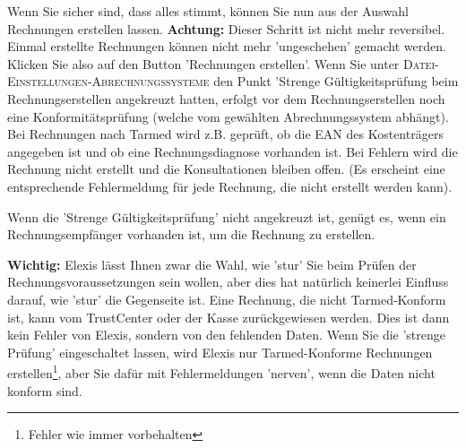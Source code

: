 \documentclass[a4paper]{scrartcl}
\begin{document}
Wenn Sie sicher sind, dass alles stimmt, können Sie nun aus der Auswahl Rechnungen erstellen lassen. \textbf{Achtung:} Dieser Schritt ist nicht mehr reversibel. Einmal erstellte Rechnungen können nicht mehr 'ungeschehen' gemacht werden. Klicken Sie also auf den Button 'Rechnungen erstellen'.
Wenn Sie unter \textsc{Datei-Einstellungen-Abrechnungssysteme} den Punkt 'Strenge Gültigkeitsprüfung beim Rechnungserstellen  angekreuzt hatten, erfolgt vor dem Rechnungserstellen noch eine Konformitätsprüfung (welche  vom gewählten Abrechnungssystem abhängt). Bei Rechnungen nach Tarmed wird z.B. geprüft, ob die EAN des Kostenträgers angegeben ist und ob eine Rechnungsdiagnose vorhanden ist. Bei Fehlern wird die Rechnung nicht erstellt und die Konsultationen bleiben offen. (Es erscheint eine entsprechende Fehlermeldung für jede Rechnung, die nicht erstellt werden kann).

Wenn die 'Strenge Gültigkeitsprüfung' nicht angekreuzt ist, genügt es, wenn ein Rechnungsempfänger vorhanden ist, um die Rechnung zu erstellen.

\medskip

\textbf{Wichtig:} Elexis lässt Ihnen zwar die Wahl, wie 'stur' Sie beim Prüfen der Rechnungsvoraussetzungen sein wollen, aber dies hat natürlich keinerlei Einfluss darauf, wie 'stur' die Gegenseite ist. Eine Rechnung, die nicht Tarmed-Konform ist, kann vom TrustCenter oder der Kasse zurückgewiesen werden. Dies ist dann kein Fehler von Elexis, sondern von den fehlenden Daten. Wenn Sie die 'strenge Prüfung' eingeschaltet lassen, wird Elexis nur Tarmed-Konforme Rechnungen erstellen\footnote{Fehler wie immer vorbehalten}, aber Sie dafür mit Fehlermeldungen 'nerven', wenn die Daten nicht konform sind.
\end{document}
